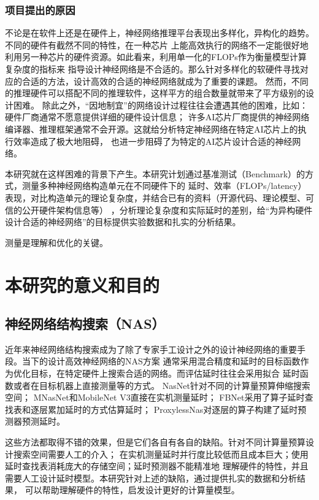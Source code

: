 \subsubsection{项目提出的原因}

不论是在软件上还是在硬件上，神经网络推理平台表现出多样化，异构化的趋势。不同的硬件有截然不同的特性，在一种芯片
上能高效执行的网络不一定能很好地利用另一种芯片的硬件资源。如此看来，利用单一化的FLOPs作为衡量模型计算复杂度的指标来
指导设计神经网络是不合适的。那么针对多样化的软硬件寻找对应的合适的方法，设计高效的合适的神经网络就成为了重要的课题。
然而，不同的推理硬件可以搭配不同的推理软件，这样平方的组合数量就带来了平方级别的设计困难。
除此之外，“因地制宜”的网络设计过程往往会遭遇其他的困难，比如：硬件厂商通常不愿意提供详细的硬件设计信息；
许多AI芯片厂商提供的神经网络编译器、推理框架通常不会开源。这就给分析特定神经网络在特定AI芯片上的执行效率造成了极大地阻碍，
也进一步阻碍了为特定的AI芯片设计合适的神经网络。

本研究就在这样困难的背景下产生。本研究计划通过基准测试（Benchmark）的方式，测量多种神经网络构造单元在不同硬件下的
延时、效率（FLOPs/latency）表现，对比构造单元的理论复杂度，并结合已有的资料（开源代码、理论模型、可信的公开硬件架构信息等）
，分析理论复杂度和实际延时的差别，给“为异构硬件设计合适的神经网络”的目标提供实验数据和扎实的分析结果。

测量是理解和优化的关键。

\section{本研究的意义和目的}

\subsection{神经网络结构搜索（NAS）}
近年来神经网络结构搜索成为了除了专家手工设计之外的设计神经网络的重要手段。当下的设计高效神经网络的NAS方案
通常采用混合精度和延时的目标函数作为优化目标，在特定硬件上搜索合适的网络。而评估延时往往会采用拟合
延时函数或者在目标机器上直接测量等的方式。
NasNet\cite{zoph2018learning}针对不同的计算量预算伸缩搜索空间；
MNasNet\cite{tan2019mnasnet}和MobileNet V3\cite{howard2019searching}直接在实机测量延时；
FBNet\cite{wu2019fbnet}采用了算子延时查找表和逐层累加延时的方式估算延时；
ProxylessNas\cite{cai2018proxylessnas}对逐层的算子构建了延时预测器预测延时。

这些方法都取得不错的效果，但是它们各自有各自的缺陷。针对不同计算量预算设计搜索空间需要人工的介入；
在实机测量延时并行度比较低而且成本巨大；使用延时查找表消耗庞大的存储空间；延时预测器不能精准地
理解硬件的特性，并且需要人工设计延时模型。本研究针对上述的缺陷，通过提供扎实的数据和分析结果，
可以帮助理解硬件的特性，启发设计更好的计算量模型。
